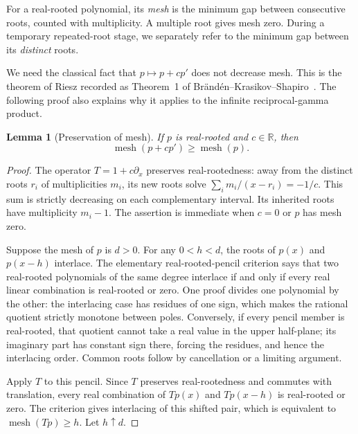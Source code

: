 \documentclass[11pt,letterpaper]{article}
\newtheorem{lemma}[theorem]{Lemma}
\theoremstyle{definition}
\theoremstyle{remark}
\begin{document}
For a real-rooted polynomial, its \emph{mesh} is the minimum gap between
consecutive roots, counted with multiplicity.  A multiple root gives mesh
zero.  During a temporary repeated-root stage, we separately refer to
the minimum gap between its \emph{distinct} roots.

We need the classical fact that $p\mapsto p+cp'$ does not decrease
mesh.  This is the theorem of Riesz recorded as Theorem~1 of
Br\"and\'en--Krasikov--Shapiro~\cite{efflerch:BKS}.  The following proof
also explains why it applies to the infinite reciprocal-gamma product.

\begin{lemma}[Preservation of mesh]
\label{efflerch:lem:mesh-preserve}
If $p$ is real-rooted and $c\in\mathbb R$, then
\[
 \operatorname{mesh}(p+cp')\geq\operatorname{mesh}(p).
\]
\end{lemma}
\begin{proof}
The operator $T=1+c\partial_x$ preserves real-rootedness: away from
the distinct roots $r_i$ of multiplicities $m_i$, its new roots solve
$\sum_i m_i/(x-r_i)=-1/c$.  This sum is strictly decreasing on each
complementary interval.  Its inherited roots have multiplicity $m_i-1$.
The assertion is immediate when $c=0$ or $p$ has mesh zero.

Suppose the mesh of $p$ is $d>0$.  For any $0<h<d$, the roots of $p(x)$
and $p(x-h)$ interlace.  The elementary real-rooted-pencil criterion
says that two real-rooted polynomials of the same degree interlace
if and only if every real linear combination is real-rooted or zero.
One proof divides one polynomial by the other: the interlacing case
has residues of one sign, which makes the rational quotient strictly
monotone between poles.  Conversely, if every pencil member is
real-rooted, that quotient cannot take a real value in the upper
half-plane; its imaginary part has constant sign there, forcing the
residues, and hence the interlacing order.  Common roots follow by
cancellation or a limiting argument.

Apply $T$ to this pencil.  Since $T$ preserves real-rootedness and
commutes with translation, every real combination of $Tp(x)$ and
$Tp(x-h)$ is real-rooted or zero.  The criterion gives interlacing
of this shifted pair, which is equivalent to
$\operatorname{mesh}(Tp)\geq h$.  Let $h\uparrow d$.
\end{proof}
\end{document}
